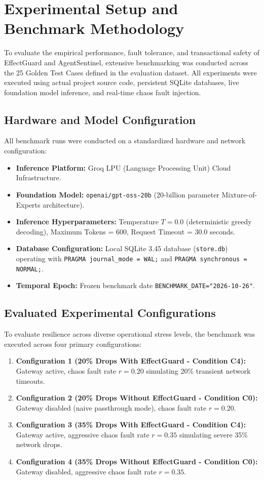 \section{Experimental Setup and Benchmark Methodology}
\label{sec:res_setup}
To evaluate the empirical performance, fault tolerance, and transactional safety of EffectGuard and AgentSentinel, extensive benchmarking was conducted across the 25 Golden Test Cases defined in the evaluation dataset. All experiments were executed using actual project source code, persistent SQLite databases, live foundation model inference, and real-time chaos fault injection.

\subsection{Hardware and Model Configuration}
All benchmark runs were conducted on a standardized hardware and network configuration:
\begin{itemize}
    \item \textbf{Inference Platform:} Groq LPU (Language Processing Unit) Cloud Infrastructure.
    \item \textbf{Foundation Model:} \texttt{openai/gpt-oss-20b} (20-billion parameter Mixture-of-Experts architecture).
    \item \textbf{Inference Hyperparameters:} Temperature $T = 0.0$ (deterministic greedy decoding), Maximum Tokens = 600, Request Timeout = 30.0 seconds.
    \item \textbf{Database Configuration:} Local SQLite 3.45 database (\texttt{store.db}) operating with \texttt{PRAGMA journal\_mode = WAL;} and \texttt{PRAGMA synchronous = NORMAL;}.
    \item \textbf{Temporal Epoch:} Frozen benchmark date \texttt{BENCHMARK\_DATE="2026-10-26"}.
\end{itemize}

\subsection{Evaluated Experimental Configurations}
To evaluate resilience across diverse operational stress levels, the benchmark was executed across four primary configurations:
\begin{enumerate}
    \item \textbf{Configuration 1 (20\% Drops With EffectGuard - Condition C4):} Gateway active, chaos fault rate $r = 0.20$ simulating 20\% transient network timeouts.
    \item \textbf{Configuration 2 (20\% Drops Without EffectGuard - Condition C0):} Gateway disabled (naive passthrough mode), chaos fault rate $r = 0.20$.
    \item \textbf{Configuration 3 (35\% Drops With EffectGuard - Condition C4):} Gateway active, aggressive chaos fault rate $r = 0.35$ simulating severe 35\% network drops.
    \item \textbf{Configuration 4 (35\% Drops Without EffectGuard - Condition C0):} Gateway disabled, aggressive chaos fault rate $r = 0.35$.
\end{enumerate}


